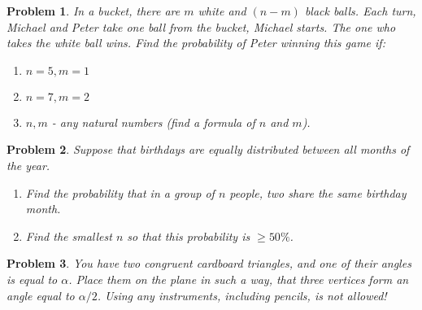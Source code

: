 \documentclass[a4paper,12pt]{article}
\theoremstyle{perfect}
\newtheorem{prb}{Problem}
\begin{document}
\begin{prb}
In a bucket, there are $m$ white and $(n-m)$ black balls. Each turn, Michael and Peter take one ball from the bucket, Michael starts. The one who takes the white ball wins. Find the probability of Peter winning this game if:
\begin{enumerate}
\item $n=5, m=1$
\item $n=7, m=2$
\item $n,m$ - any natural numbers (find a formula of $n$ and $m$).
\end{enumerate}
\end{prb}


\begin{prb}
Suppose that birthdays are equally distributed between all months of the year.
\begin{enumerate}
\item Find the probability that in a group of  $n$ people, two share the same birthday month.
\item Find the smallest $n$ so that this probability is $\geq 50\%$.
\end{enumerate}
\end{prb} 

\begin{prb}
You have two congruent cardboard triangles, and one of their angles is equal to $\alpha$. 
Place them on the plane in such a way, that three vertices form an angle equal to $\alpha / 2$. Using any instruments, including pencils, is not allowed!
\end{prb}

 
\end{document}
